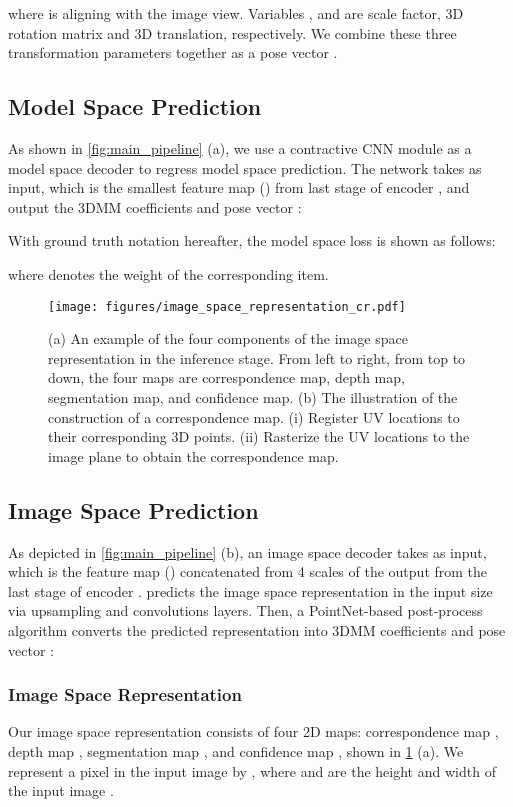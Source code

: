 \documentclass[10pt,twocolumn,letterpaper]{article}
\begin{document}
where  is aligning with the image view. Variables ,  and  are scale factor, 3D rotation matrix and 3D translation, respectively. We combine these three transformation parameters together as a pose vector .


\subsection{Model Space Prediction}
\label{subsec:meth_2}
As shown in \cref{fig:main_pipeline} (a), we use a contractive CNN module as a model space decoder  to regress model space prediction. 
The network takes  as input, which is the smallest feature map () from last stage of encoder , and output the 3DMM coefficients  and pose vector :


With ground truth notation  hereafter, the model space loss is shown as follows:

where  denotes the weight of the corresponding item.

\begin{figure}[t]
  \centering
   \texttt{[image: figures/image\_space\_representation\_cr.pdf]}

   \caption{(a) An example of the four components of the image space representation in the inference stage. From left to right, from top to down, the four maps are correspondence map, depth map, segmentation map, and confidence map. (b) The illustration of the construction of a correspondence map. (i) Register UV locations to their corresponding 3D points. (ii) Rasterize the UV locations to the image plane to obtain the correspondence map.}
   \label{fig:image_space_representation}
\end{figure}


\subsection{Image Space Prediction}
\label{subsec:meth_3}
As depicted in \cref{fig:main_pipeline} (b), an image space decoder  takes  as input, which is the feature map () concatenated from 4 scales of the output from the last stage of encoder .
 predicts the image space representation  in the input size via upsampling and convolutions layers.
Then, a PointNet-based post-process algorithm  converts the predicted representation into 3DMM coefficients  and pose vector : 


\subsubsection{Image Space Representation}
Our image space representation  consists of four 2D maps: correspondence map , depth map , segmentation map , and confidence map , shown in \cref{fig:image_space_representation} (a). 
We represent a pixel  in the input image by , where  and  are the height and width of the input image .
\end{document}
